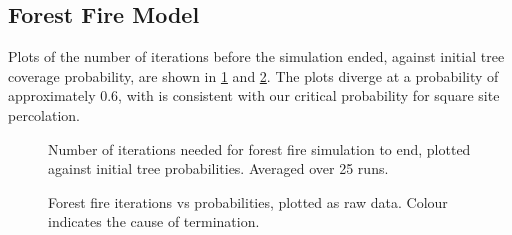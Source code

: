 \documentclass[%
 reprint,
 amsmath,amssymb,
 aps,
]{revtex4-2}
\begin{document}

\subsection{Forest Fire Model}
Plots of the number of iterations before the simulation ended, against initial tree coverage probability, are shown in \cref{fig:FF_mean} and \cref{fig:FF_rawdata}. The plots diverge at a probability of approximately 0.6, with is consistent with our critical probability for square site percolation.
\begin{figure}
    \centering
    \caption{Number of iterations needed for forest fire simulation to end, plotted against initial tree probabilities. Averaged over 25 runs.}
    \label{fig:FF_mean}
\end{figure}

\begin{figure}
    \centering
    \caption{Forest fire iterations vs probabilities, plotted as raw data. Colour indicates the cause of termination.}
    \label{fig:FF_rawdata}
\end{figure}
\end{document}
